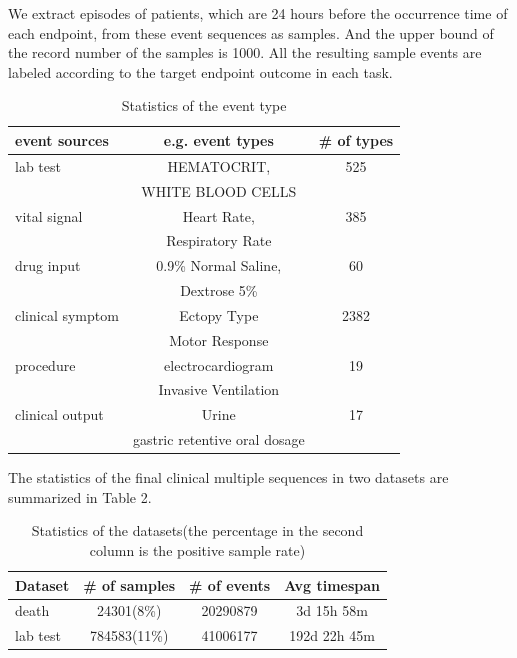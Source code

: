 \documentclass[letterpaper]{article} %
\begin{document}
We extract episodes of patients, which are 24 hours before the occurrence time of each endpoint, from these event sequences as samples. And the upper bound of the record number of the samples is 1000. All the resulting sample events are labeled according to the target endpoint outcome in each task.

\begin{table}[!t]
\renewcommand\arraystretch{1}
\centering
\begin{tabular}{|l|c|c|}
\hline
\textbf{event sources}        & \textbf{e.g. event types}  & \textbf{\# of types}    \\
\hline


lab test & HEMATOCRIT, & 525 \\
& WHITE BLOOD CELLS&\\
\hline %
vital signal      & Heart Rate, & 385\\
&Respiratory Rate&\\
\hline %
drug input & 0.9\% Normal Saline, & 60 \\
&Dextrose 5\%&\\
\hline %
clinical symptom     & Ectopy Type&2382\\
&Motor Response&\\
\hline %
procedure     & electrocardiogram & 19 \\
&Invasive Ventilation&\\
\hline %
clinical output      & Urine & 17\\
&gastric retentive oral dosage&\\
\hline %
\end{tabular}
\caption{Statistics of  the  event type}
\label{tab:some type multiple sequences}
\end{table}


The statistics of the final clinical multiple sequences in two datasets are summarized in Table 2.
\begin{table}[!t]
\renewcommand\arraystretch{1}
\centering
\begin{tabular}{|l|c|c|c|}
\hline
\textbf{Dataset}        & \textbf{\# of samples}  & \textbf{\# of events}    & \textbf{Avg timespan}\\
\hline

death      & 24301(8\%) & 20290879& 3d 15h 58m\\
\hline
lab test & 784583(11\%) & 41006177& 192d 22h 45m \\


\hline
\end{tabular}
\caption{Statistics of  the  datasets(the percentage in the second column is the positive sample rate)}
\label{tab:enropy}
\end{table}
\end{document}
